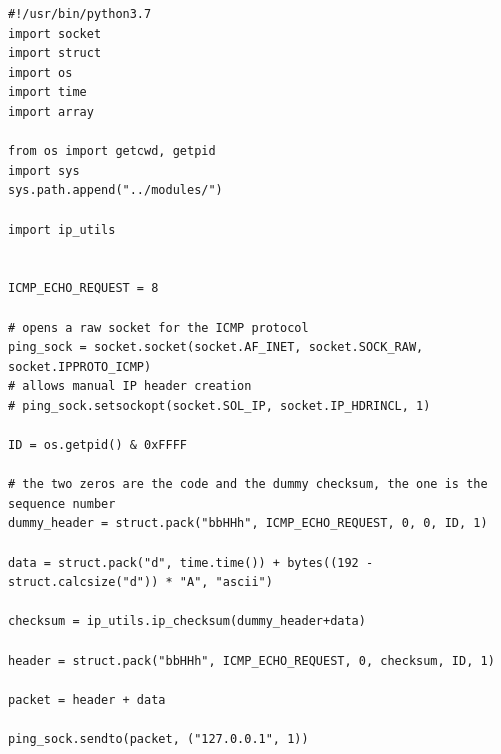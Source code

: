 \documentclass[titlepage]{article}
\begin{document}
\begin{lstlisting}[label=echosend,caption=A prototype for sending \gls{icmp} ECHO REQUEST packets.]
#!/usr/bin/python3.7
import socket
import struct
import os
import time
import array

from os import getcwd, getpid
import sys
sys.path.append("../modules/")

import ip_utils


ICMP_ECHO_REQUEST = 8

# opens a raw socket for the ICMP protocol
ping_sock = socket.socket(socket.AF_INET, socket.SOCK_RAW, socket.IPPROTO_ICMP)
# allows manual IP header creation
# ping_sock.setsockopt(socket.SOL_IP, socket.IP_HDRINCL, 1)

ID = os.getpid() & 0xFFFF

# the two zeros are the code and the dummy checksum, the one is the sequence number
dummy_header = struct.pack("bbHHh", ICMP_ECHO_REQUEST, 0, 0, ID, 1)

data = struct.pack("d", time.time()) + bytes((192 - struct.calcsize("d")) * "A", "ascii")

checksum = ip_utils.ip_checksum(dummy_header+data)

header = struct.pack("bbHHh", ICMP_ECHO_REQUEST, 0, checksum, ID, 1)

packet = header + data

ping_sock.sendto(packet, ("127.0.0.1", 1))
\end{lstlisting}
\end{document}
